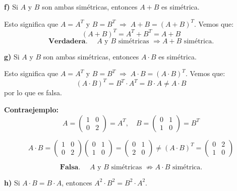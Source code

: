 \documentclass[a4paper,12pt]{article}
\begin{document}
\begin{ejercicio}[title=Ejercicio 42 (⋆)]

\textbf{f)} Si $A$ y $B$ son ambas simétricas, entonces $A + B$ es simétrica.

\vspace{0.5em}

Esto significa que $A = A^T$ y $B = B^T \;\Rightarrow\; A + B = (A + B)^T$.  
Vemos que:
\[
(A + B)^T = A^T + B^T = A + B
\]
\[
\boxed{\textbf{Verdadera. }\quad A \text{ y } B \text{ simétricas } \Rightarrow A + B \text{ simétrica.}}
\]

\vspace{1em}

\textbf{g)} Si $A$ y $B$ son ambas simétricas, entonces $A \cdot B$ es simétrica.

\vspace{0.5em}

Esto significa que $A = A^T$ y $B = B^T \;\Rightarrow\; A \cdot B = (A \cdot B)^T$.  
Vemos que:
\[
(A \cdot B)^T = B^T \cdot A^T = B \cdot A \neq A \cdot B
\]
por lo que es falsa.

\textbf{Contraejemplo:}
\[
A = \begin{pmatrix}1 & 0 \\ 0 & 2\end{pmatrix} = A^T, \quad
B = \begin{pmatrix}0 & 1 \\ 1 & 0\end{pmatrix} = B^T
\]

\[
A \cdot B = \begin{pmatrix}1 & 0 \\ 0 & 2\end{pmatrix} \begin{pmatrix}0 & 1 \\ 1 & 0\end{pmatrix} = \begin{pmatrix}0 & 1 \\ 2 & 0\end{pmatrix} \neq (A \cdot B)^T = \begin{pmatrix}0 & 2 \\ 1 & 0\end{pmatrix}
\]

\[
\boxed{\textbf{Falsa. }\quad A \text{ y } B \text{ simétricas } \not\Rightarrow A \cdot B \text{ simétrica.}}
\]

\vspace{1em}

\textbf{h)} Si $A \cdot B = B \cdot A$, entonces $A^2 \cdot B^2 = B^2 \cdot A^2$.


\end{ejercicio}
\end{document}
